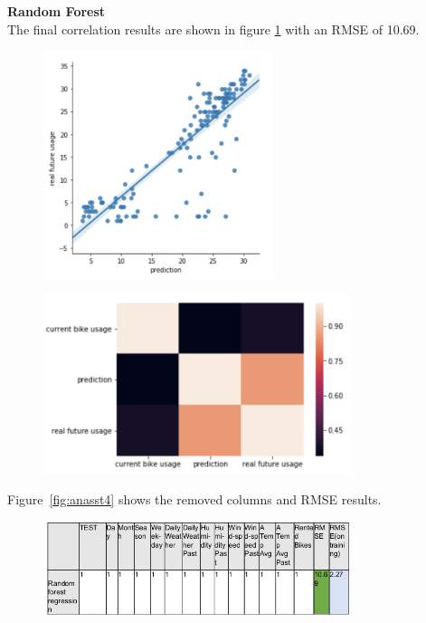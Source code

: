 \textbf{Random Forest}\\
The final correlation results are shown in figure \ref{fig:image19} with an RMSE of 10.69.
\begin{figure}[H]
\centering
\includegraphics[width=0.6\textwidth]{media/image19}\label{fig:image19}
\label{fig:image19}
\end{figure}
\begin{figure}[H]
\centering
\includegraphics[width=0.8\textwidth]{media/image1a}\label{fig:image1a}
\label{fig:image1a}
\end{figure}
Figure~\ref{fig:anasst4} shows the removed columns and RMSE results.
\begin{figure}[H]
\centering
\includegraphics[width=0.8\textwidth]{media/anasst5}\label{fig:anasst5}
\label{fig:anasst5}
\end{figure}

